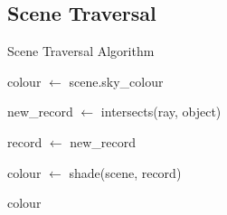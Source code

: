 \subsection{Scene Traversal}
\begin{algorithm}
\begin{algorithmic}
\caption{Scene Traversal Algorithm}
\State colour $\gets$ scene.sky\_colour

	new\_record $\gets$ intersects(ray, object)


	record $\gets$ new\_record

	\EndIf

\EndFor


	colour $\gets$ shade(scene, record)
\EndIf

\Return colour

\end{algorithmic}
\end{algorithm}

\newpage

\newpage

